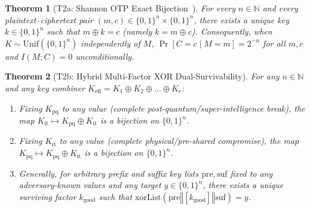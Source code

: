 \documentclass[11pt,reqno]{amsart}
\newtheorem{theorem}{Theorem}[section]
\theoremstyle{definition}
\begin{document}
\begin{theorem}[T2a: Shannon OTP Exact Bijection~\cite{shannon1949}]
\label{thm:t2a}
For every $n \in \mathbb{N}$ and every plaintext--ciphertext pair $(m, c) \in \{0,1\}^n \times \{0,1\}^n$, there exists a \emph{unique} key $k \in \{0,1\}^n$ such that $m \oplus k = c$ (namely $k = m \oplus c$). Consequently, when $K \sim \mathrm{Unif}(\{0,1\}^n)$ independently of $M$, $\Pr[C = c \mid M = m] = 2^{-n}$ for all $m, c$ and $I(M; C) = 0$ unconditionally.
\end{theorem}

\begin{theorem}[T2b: Hybrid Multi-Factor XOR Dual-Survivability]
\label{thm:t2b}
For any $n \in \mathbb{N}$ and any key combiner $K_{\mathrm{eff}} = K_1 \oplus K_2 \oplus \dots \oplus K_r$:
\begin{enumerate}[leftmargin=1.8em]
  \item Fixing $K_{\mathrm{pq}}$ to any value (complete post-quantum/super-intelligence break), the map $K_{\mathrm{it}} \mapsto K_{\mathrm{pq}} \oplus K_{\mathrm{it}}$ is a bijection on $\{0,1\}^n$.
  \item Fixing $K_{\mathrm{it}}$ to any value (complete physical/pre-shared compromise), the map $K_{\mathrm{pq}} \mapsto K_{\mathrm{pq}} \oplus K_{\mathrm{it}}$ is a bijection on $\{0,1\}^n$.
  \item Generally, for arbitrary prefix and suffix key lists $\mathrm{pre}, \mathrm{suf}$ fixed to any adversary-known values and any target $y \in \{0,1\}^n$, there exists a \emph{unique} surviving factor $k_{\mathrm{good}}$ such that $\mathrm{xorList}(\mathrm{pre} \mathbin{\Vert} [k_{\mathrm{good}}] \mathbin{\Vert} \mathrm{suf}) = y$.
\end{enumerate}
\end{theorem}
\end{document}
